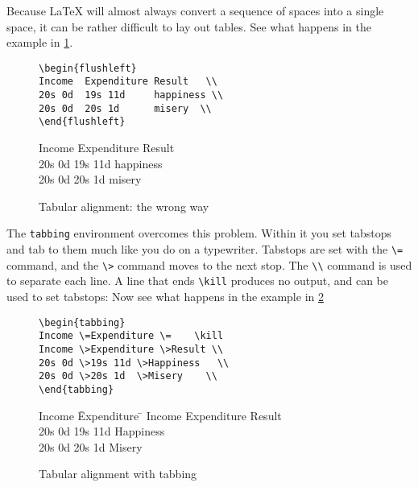 Because \LaTeX{} will almost always convert a sequence of spaces
into a single space,
it can be rather difficult to lay out tables.
See what happens in the example in \ref{fig:badtab}.
\nolinebreak
\begin{figure}
\footnotesize
\begin{minipage}[t]{0.48\textwidth}
\begin{verbatim}
\begin{flushleft}
Income  Expenditure Result   \\
20s 0d  19s 11d     happiness \\
20s 0d  20s 1d      misery  \\
\end{flushleft}
\end{verbatim}
\end{minipage}\hfill
\begin{minipage}[t]{0.48\textwidth}
\begin{flushleft}
Income  Expenditure Result   \\
20s 0d  19s 11d     happiness \\
20s 0d  20s 1d      misery  \\
\end{flushleft}
\end{minipage}
\vspace{1em}
\caption{Tabular alignment: the wrong way}
\label{fig:badtab}
\end{figure}
 
The {\tt tabbing} environment overcomes this problem. Within it you set
tabstops and tab to them much like you do on a typewriter.  Tabstops are
set with the \verb|\=| command, and the \verb|\>| command moves to the
next stop.
The \verb|\\| command is used to separate each line.
A line that ends \verb|\kill|
produces no output, and can be used to set tabstops:
Now see what happens in the example in \ref{fig:tabbing}
\nolinebreak
\begin{figure}
\footnotesize
\begin{minipage}[t]{0.48\textwidth}
\begin{verbatim}
\begin{tabbing}
Income \=Expenditure \=    \kill
Income \>Expenditure \>Result \\
20s 0d \>19s 11d \>Happiness   \\
20s 0d \>20s 1d  \>Misery    \\
\end{tabbing}
\end{verbatim}
\end{minipage}\hfill
\begin{minipage}[t]{0.48\textwidth}
\begin{tabbing}
Income \=Expenditure \=    \kill
Income \>Expenditure \>Result \\
20s 0d \>19s 11d \>Happiness   \\
20s 0d \>20s 1d  \>Misery    \\
\end{tabbing}
\end{minipage}
\vspace{1em}
\caption{Tabular alignment with tabbing}
\label{fig:tabbing}
\end{figure}
 
